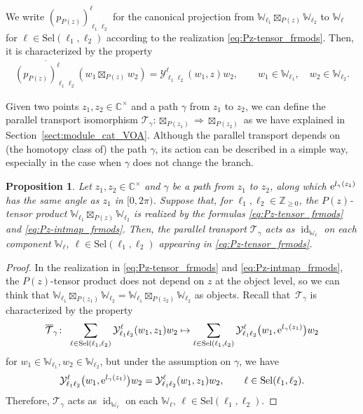 \documentclass[pdftex]{sigma}
\numberwithin{equation}{section}
\newtheorem{prop}[thm]{Proposition}
 { \theoremstyle{definition}
\newtheorem{defn}[thm]{Definition}
\newtheorem{Note}[thm]{Note}
\newtheorem{exam}[thm]{Example}
\newtheorem{rem}[thm]{Remark} }
\newcommand{\ol}[1]{\overline{#1}}
\newcommand{\id}{\operatorname{id}}
\newcommand{\bC}{\mathbb{C}}
\newcommand{\bZ}{\mathbb{Z}}
\newcommand{\cT}{\mathcal{T}}
\newcommand{\Sel}{\mathrm{Sel}}
\newcommand{\voaint}{\mathcal{Y}}
\newcommand{\vmodvec}{w}
\newcommand{\virmod}{\mathbb{W}}
\newcommand{\pzproj}[4]{(p_{P(#1)})_{#2 #3}^{#4}}
\begin{document}
We write $\pzproj{z}{\ell_{1}}{\ell_{2}}{\ell}$ for the canonical projection from $\virmod_{\ell_{1}}\boxtimes_{P(z)}\virmod_{\ell_{2}}$ to $\virmod_{\ell}$ for $\ell\in \Sel (\ell_{1},\ell_{2})$ according to the realization \eqref{eq:Pz-tensor_frmods}.
Then, it is characterized by the property
\begin{gather*}
 \ol{\pzproj{z}{\ell_{1}}{\ell_{2}}{\ell}} (\vmodvec_{1}\boxtimes_{P(z)}\vmodvec_{2})=\voaint_{\ell_{1} \ell_{2}}^{\ell}(\vmodvec_{1},z)\vmodvec_{2},\qquad \vmodvec_{1}\in\virmod_{\ell_{1}}, \quad \vmodvec_{2}\in\virmod_{\ell_{2}}.
\end{gather*}

Given two points $z_{1},z_{2}\in \bC^{\times}$ and a path $\gamma$ from $z_{1}$ to $z_{2}$, we can define the parallel transport isomorphism $\cT_{\gamma}\colon \boxtimes_{P(z_{1})}\Rightarrow \boxtimes_{P(z_{2})}$ as we have explained in Section~\ref{sect:module_cat_VOA}.
Although the parallel transport depends on (the homotopy class of) the path $\gamma$, its action can be described in a simple way, especially in the case when $\gamma$ does not change the branch.

\begin{prop}
\label{prop:triviality_parallel_transport}
Let $z_{1},z_{2}\in \bC^{\times}$ and $\gamma$ be a path from $z_{1}$ to $z_{2}$, along which ${\rm e}^{l_{\gamma}(z_{1})}$ has the same angle as $z_{1}$ in $[0,2\pi)$.
Suppose that, for $\ell_{1},\ell_{2}\in \bZ_{\geq 0}$, the $P(z)$-tensor product $\virmod_{\ell_{1}}\boxtimes_{P(z)}\virmod_{\ell_{2}}$ is realized by the formulas \eqref{eq:Pz-tensor_frmods} and \eqref{eq:Pz-intmap_frmods}.
Then, the parallel transport $\cT_{\gamma}$ acts as $\id_{\virmod_{\ell}}$ on each component $\virmod_{\ell}$, $\ell\in \Sel(\ell_{1},\ell_{2})$ appearing in \eqref{eq:Pz-tensor_frmods}.
\end{prop}
\begin{proof}
In the realization in \eqref{eq:Pz-tensor_frmods} and \eqref{eq:Pz-intmap_frmods}, the $P(z)$-tensor product does not depend on $z$ at the object level, so we can think that $\virmod_{\ell_{1}}\boxtimes_{P(z_{1})}\virmod_{\ell_{2}}=\virmod_{\ell_{1}}\boxtimes_{P(z_{2})}\virmod_{\ell_{2}}$ as objects.
Recall that~$\cT_{\gamma}$ is characterized by the property
\begin{gather*}
 \ol{\cT}_{\gamma}\colon\ \sum_{\ell\in\Sel(\ell_{1},\ell_{2})}\voaint_{\ell_{1} \ell_{2}}^{\ell}(\vmodvec_{1},z_{1})\vmodvec_{2}\mapsto \sum_{\ell\in\Sel(\ell_{1},\ell_{2})}\voaint_{\ell_{1} \ell_{2}}^{\ell}\big(\vmodvec_{1},{\rm e}^{l_{\gamma}(z_{1})}\big)\vmodvec_{2}
\end{gather*}
for $\vmodvec_{1}\in\virmod_{\ell_{1}}, \vmodvec_{2}\in\virmod_{\ell_{2}}$,
but under the assumption on $\gamma$, we have
\begin{gather*}
 \voaint_{\ell_{1} \ell_{2}}^{\ell}\big(\vmodvec_{1},{\rm e}^{l_{\gamma}(z_{1})}\big)\vmodvec_{2}=\voaint_{\ell_{1} \ell_{2}}^{\ell}(\vmodvec_{1},z_{1})\vmodvec_{2},\qquad \ell\in \Sel (\ell_{1},\ell_{2}).
\end{gather*}
Therefore, $\cT_{\gamma}$ acts as $\id_{\virmod_{\ell}}$ on each $\virmod_{\ell}$, $\ell\in\Sel (\ell_{1},\ell_{2})$.
\end{proof}
\end{document}
